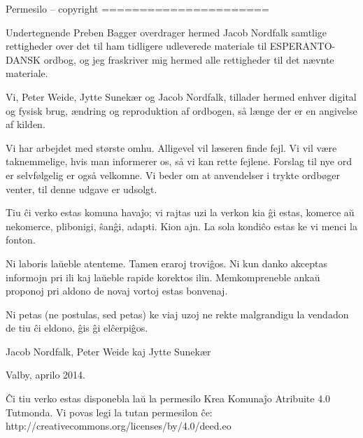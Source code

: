 Permesilo -- copyright
======================

Undertegnende Preben Bagger overdrager hermed Jacob Nordfalk samtlige
rettigheder over det til ham tidligere udleverede materiale til
ESPERANTO-DANSK ordbog, og jeg fraskriver mig hermed alle rettigheder
til det nævnte materiale.

Vi, Peter Weide, Jytte Sunekær og Jacob Nordfalk, tillader hermed
enhver digital og fysisk brug, ændring og reproduktion af ordbogen,
så længe der er en angivelse af kilden.

Vi har arbejdet med største omhu. Alligevel vil læseren finde
fejl. Vi vil være taknemmelige, hvis man informerer os, så vi
kan rette fejlene. Forslag til nye ord er selvfølgelig er også
velkomne. Vi beder om at anvendelser i trykte ordbøger venter, til
denne udgave er udsolgt.

Tiu ĉi verko estas komuna havaĵo; vi rajtas uzi la verkon
kia ĝi estas, komerce
aŭ nekomerce, plibonigi, ŝanĝi, adapti. Kion ajn. La sola
kondiĉo estas ke vi menci la fonton.

Ni laboris laŭeble atenteme. Tamen eraroj troviĝos. Ni kun danko
akceptas informojn pri ili kaj laŭeble rapide korektos ilin.
Memkompreneble ankaŭ proponoj pri aldono de novaj vortoj estas
bonvenaj.

Ni petas (ne postulas, sed petas) ke viaj uzoj ne rekte malgrandigu la
vendadon de tiu ĉi eldono, ĝis ĝi elĉerpiĝos.


Jacob Nordfalk, Peter Weide kaj Jytte Sunekær

Valby, aprilo 2014.


Ĉi tiu verko estas disponebla laŭ la permesilo
Krea Komunaĵo Atribuite 4.0 Tutmonda.
Vi povas legi la tutan permesilon ĉe:
http://creativecommons.org/licenses/by/4.0/deed.eo